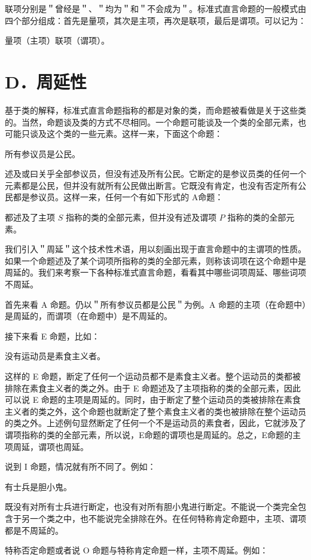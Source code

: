 联项分别是＂曾经是＂、＂均为＂和＂不会成为＂。标准式直言命题的一般模式由四个部分组成：首先是量项，其次是主项，再次是联项，最后是谓项。可以记为：

量项（主项）联项（谓项）。

\section*{D．周延性}
基于类的解释，标准式直言命题指称的都是对象的类，而命题被看做是关于这些类的。当然，命题谈及类的方式不尽相同。一个命题可能谈及一个类的全部元素，也可能只谈及这个类的一些元素。这样一来，下面这个命题：

\begin{displayquote}
所有参议员是公民。
\end{displayquote}

述及或曰关乎全部参议员，但没有述及所有公民。它断定的是参议员类的任何一个元素都是公民，但并没有就所有公民做出断言。它既没有肯定，也没有否定所有公民都是参议员。这样一来，任何一个有如下形式的 A命题：

都述及了主项 $S$ 指称的类的全部元素，但并没有述及谓项 $P$ 指称的类的全部元素。

我们引入＂周延＂这个技术性术语，用以刻画出现于直言命题中的主谓项的性质。如果一个命题述及了某个词项所指称的类的全部元素，则称该词项在这个命题中是周延的。我们来考察一下各种标准式直言命题，看看其中哪些词项周延、哪些词项不周延。

首先来看 A 命题。仍以＂所有参议员都是公民＂为例。A 命题的主项（在命题中）是周延的，而谓项（在命题中）是不周延的。

接下来看 E 命题，比如：

没有运动员是素食主义者。

这样的 E 命题，断定了任何一个运动员都不是素食主义者。整个运动员的类都被排除在素食主义者的类之外。由于 E 命题述及了主项指称的类的全部元素，因此可以说 E 命题的主项是周延的。同时，由于断定了整个运动员的类被排除在素食主义者的类之外，这个命题也就断定了整个素食主义者的类也被排除在整个运动员的类之外。上述例句显然断定了任何一个不是运动员的素食者，因此，它就涉及了谓项指称的类的全部元素，所以说，E命题的谓项也是周延的。总之，E命题的主项周延，谓项也周延。

说到 I 命题，情况就有所不同了。例如：

有士兵是胆小鬼。

既没有对所有士兵进行断定，也没有对所有胆小鬼进行断定。不能说一个类完全包含于另一个类之中，也不能说完全排除在外。在任何特称肯定命题中，主项、谓项都是不周延的。

特称否定命题或者说 O 命题与特称肯定命题一样，主项不周延。例如：

